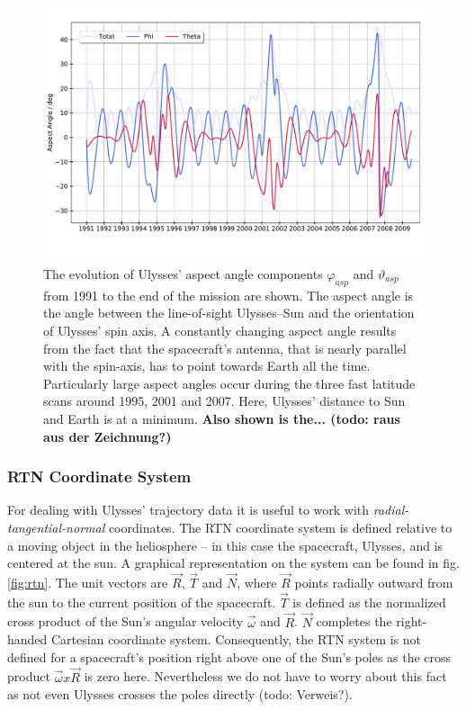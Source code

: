 \begin{figure}[h]
	\includegraphics[width=1\textwidth]{Figures/aa_new.pdf}
	\centering
	\caption{The evolution of Ulysses' aspect angle components $\varphi_{asp}$ and $\vartheta_{asp}$ from 1991 to the end of the mission are shown. The aspect angle is the angle between the line-of-sight Ulysses--Sun and the orientation of Ulysses' spin axis. A constantly changing aspect angle results from the fact that the spacecraft's antenna, that is nearly parallel with the spin-axis, has to point towards Earth all the time. Particularly large aspect angles occur during the three fast latitude scans around 1995, 2001 and 2007. Here, Ulysses' distance to Sun and Earth is at a minimum. \textbf{Also shown is the... (todo: raus aus der Zeichnung?)} }
	\label{fig:aa}
\end{figure}
%

%
\subsubsection{RTN Coordinate System}
For dealing with Ulysses' trajectory data it is useful to work with \textit{radial-tangential-normal} coordinates. The RTN coordinate system is defined relative to a moving object in the heliosphere -- in this case the spacecraft, Ulysses, and is centered at the sun. A graphical representation on the system can be found in fig. \ref{fig:rtn}. The unit vectors are $\vec{R}$, $\vec{T}$ and $\vec{N}$, where $\vec{R}$ points radially outward from the sun to the current position of the spacecraft. $\vec{T}$ is defined as the normalized cross product of the Sun's angular velocity $\vec{\omega}$ and $\vec{R}$. $\vec{N}$ completes the right-handed Cartesian coordinate system. Consequently, the RTN system is not defined for a spacecraft's position right above one of the Sun's poles as the cross product $\vec{\omega} x \vec{R}$ is zero here. Nevertheless we do not have to worry about this fact as not even Ulysses crosses the poles directly (todo: Verweis?).
